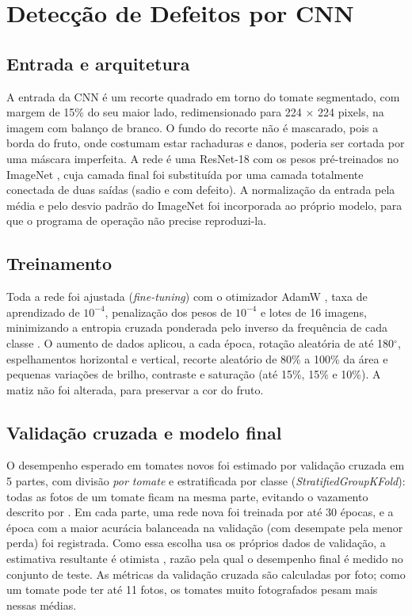 \section{Detecção de Defeitos por CNN}

\subsection{Entrada e arquitetura}

A entrada da CNN é um recorte quadrado em torno do tomate segmentado, com margem de 15\% do seu maior lado, redimensionado para 224 $\times$ 224 pixels, na imagem com balanço de branco. O fundo do recorte não é mascarado, pois a borda do fruto, onde costumam estar rachaduras e danos, poderia ser cortada por uma máscara imperfeita. A rede é uma ResNet-18 \cite{he2016} com os pesos pré-treinados no ImageNet \cite{deng2009}, cuja camada final foi substituída por uma camada totalmente conectada de duas saídas (sadio e com defeito). A normalização da entrada pela média e pelo desvio padrão do ImageNet foi incorporada ao próprio modelo, para que o programa de operação não precise reproduzi-la.

\subsection{Treinamento}

Toda a rede foi ajustada (\textit{fine-tuning}) com o otimizador AdamW \cite{loshchilov2019}, taxa de aprendizado de $10^{-4}$, penalização dos pesos de $10^{-4}$ e lotes de 16 imagens, minimizando a entropia cruzada ponderada pelo inverso da frequência de cada classe \cite{he2009}. O aumento de dados aplicou, a cada época, rotação aleatória de até 180$^\circ$, espelhamentos horizontal e vertical, recorte aleatório de 80\% a 100\% da área e pequenas variações de brilho, contraste e saturação (até 15\%, 15\% e 10\%). A matiz não foi alterada, para preservar a cor do fruto.

\subsection{Validação cruzada e modelo final}

O desempenho esperado em tomates novos foi estimado por validação cruzada em 5 partes, com divisão \emph{por tomate} e estratificada por classe (\textit{StratifiedGroupKFold}): todas as fotos de um tomate ficam na mesma parte, evitando o vazamento descrito por \textcite{kapoor2023}. Em cada parte, uma rede nova foi treinada por até 30 épocas, e a época com a maior acurácia balanceada na validação (com desempate pela menor perda) foi registrada. Como essa escolha usa os próprios dados de validação, a estimativa resultante é otimista \cite{cawley2010}, razão pela qual o desempenho final é medido no conjunto de teste. As métricas da validação cruzada são calculadas por foto; como um tomate pode ter até 11 fotos, os tomates muito fotografados pesam mais nessas médias.

